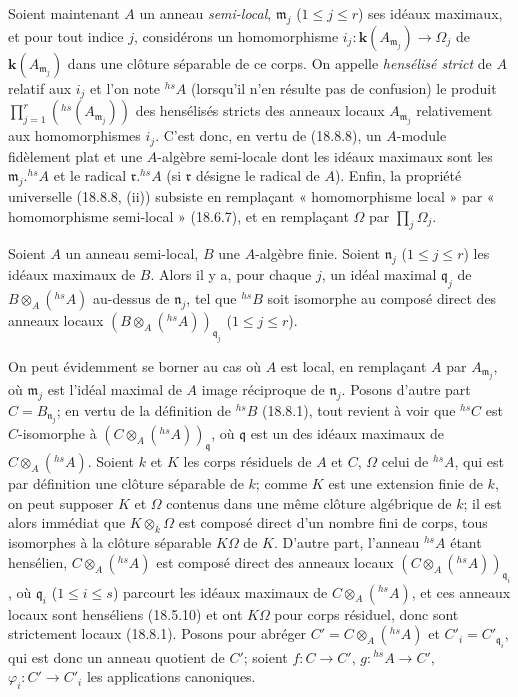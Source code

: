 \begin{env}[18.8.9]
Soient maintenant $A$ un anneau \emph{semi-local}, $\mathfrak m_j$ ($1\leq j\leq r$) ses idéaux maximaux, et pour tout indice $j$, considérons un homomorphisme $i_j:\boldsymbol{k}(A_{\mathfrak m_j})\to\Omega_j$ de $\boldsymbol{k}(A_{\mathfrak m_j})$ dans une clôture séparable de ce corps. On appelle \emph{hensélisé strict} de $A$ relatif aux $i_j$ et l'on note ${}^{hs}\!A$ (lorsqu'il n'en résulte pas de confusion) le produit $\prod_{j=1}^r({}^{hs}(A_{\mathfrak m_j}))$ des hensélisés stricts des anneaux locaux $A_{\mathfrak m_j}$ relativement aux homomorphismes $i_j$.
C'est donc, en vertu de (18.8.8), un $A$-module fidèlement plat et une $A$-algèbre semi-locale dont les idéaux maximaux sont les $\mathfrak m_j.{}^{hs}\!A$ et le radical $\mathfrak r.{}^{hs}\!A$ (si $\mathfrak r$ désigne le radical de $A$). Enfin, la propriété universelle (18.8.8, (ii)) subsiste en remplaçant « homomorphisme local » par « homomorphisme semi-local » (18.6.7), et en remplaçant $\Omega$ par $\prod_j\Omega_j$.
\end{env}

\begin{proposition}[18.8.10]
\label{IV.18.8.10}
Soient $A$ un anneau semi-local, $B$ une $A$-algèbre finie. Soient $\mathfrak n_j$ \textup{($1\leq j\leq r$)} les idéaux maximaux de $B$. Alors il y a, pour chaque $j$, un idéal maximal $\mathfrak q_j$ de $B\otimes_A({}^{hs}\!A)$ au-dessus de $\mathfrak n_j$, tel que ${}^{hs}\!B$ soit isomorphe au composé direct des anneaux locaux $(B\otimes_A({}^{hs}\!A))_{\mathfrak q_j}$ \textup{($1\leq j\leq r$)}.
\end{proposition}

On peut évidemment se borner au cas où $A$ est local, en remplaçant $A$ par $A_{\mathfrak m_j}$, où $\mathfrak m_j$ est l'idéal maximal de $A$ image réciproque de $\mathfrak n_j$. Posons d'autre part $C=B_{\mathfrak n_j}$; en vertu de la définition de ${}^{hs}\!B$ (18.8.1), tout revient à voir que ${}^{hs}\!C$ est $C$-isomorphe à $(C\otimes_A({}^{hs}\!A))_{\mathfrak q}$, où $\mathfrak q$ est un des idéaux maximaux de $C\otimes_A({}^{hs}\!A)$. Soient $k$ et $K$ les corps résiduels de $A$ et $C$, $\Omega$ celui de ${}^{hs}\!A$, qui est par définition une clôture séparable de $k$; comme $K$ est une extension finie de $k$, on peut supposer $K$ et $\Omega$ contenus dans une même clôture algébrique de $k$; il est alors immédiat que $K\otimes_k\Omega$ est composé direct d'un nombre fini de corps, tous isomorphes à la clôture séparable $K\Omega$ de $K$. D'autre part, l'anneau ${}^{hs}\!A$ étant hensélien, $C\otimes_A({}^{hs}\!A)$ est composé direct des anneaux locaux $(C\otimes_A({}^{hs}\!A))_{\mathfrak q_i}$, où $\mathfrak q_i$ ($1\leq i\leq s$) parcourt les idéaux maximaux de $C\otimes_A({}^{hs}\!A)$, et ces anneaux locaux sont henséliens (18.5.10) et ont $K\Omega$ pour corps résiduel, donc sont strictement locaux (18.8.1). Posons pour abréger $C'=C\otimes_A({}^{hs}\!A)$ et $C'_i=C'_{\mathfrak q_i}$, qui est donc un anneau quotient de $C'$; soient $f:C\to C'$, $g:{}^{hs}\!A\to C'$, $\varphi_i:C'\to C'_i$ les applications canoniques.

